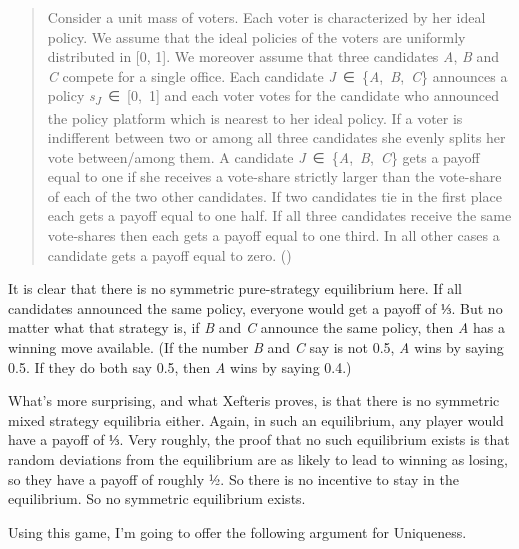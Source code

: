 \documentclass[
  10pt,
  letterpaper,
  DIV=11,
  numbers=noendperiod,
  twoside]{scrartcl}
\begin{document}
\begin{quote}
Consider a unit mass of voters. Each voter is characterized by her ideal
policy. We assume that the ideal policies of the voters are uniformly
distributed in {[}0, 1{]}. We moreover assume that three candidates
\emph{A}, \emph{B} and \emph{C} compete for a single office. Each
candidate \emph{J}~∈~\{\emph{A},~\emph{B},~\emph{C}\} announces a policy
\emph{s\textsubscript{J}}~∈~{[}0,~1{]} and each voter votes for the
candidate who announced the policy platform which is nearest to her
ideal policy. If a voter is indifferent between two or among all three
candidates she evenly splits her vote between/among them. A candidate
\emph{J}~∈~\{\emph{A},~\emph{B},~\emph{C}\} gets a payoff equal to one
if she receives a vote-share strictly larger than the vote-share of each
of the two other candidates. If two candidates tie in the first place
each gets a payoff equal to one half. If all three candidates receive
the same vote-shares then each gets a payoff equal to one third. In all
other cases a candidate gets a payoff equal to zero.
()
\end{quote}

It is clear that there is no symmetric pure-strategy equilibrium here.
If all candidates announced the same policy, everyone would get a payoff
of ⅓. But no matter what that strategy is, if \emph{B} and \emph{C}
announce the same policy, then \emph{A} has a winning move available.
(If the number \emph{B} and \emph{C} say is not 0.5, \emph{A} wins by
saying 0.5. If they do both say 0.5, then \emph{A} wins by saying 0.4.)

What's more surprising, and what Xefteris proves, is that there is no
symmetric mixed strategy equilibria either. Again, in such an
equilibrium, any player would have a payoff of ⅓. Very roughly, the
proof that no such equilibrium exists is that random deviations from the
equilibrium are as likely to lead to winning as losing, so they have a
payoff of roughly ½. So there is no incentive to stay in the
equilibrium. So no symmetric equilibrium exists.

Using this game, I'm going to offer the following argument for
Uniqueness.
\end{document}
